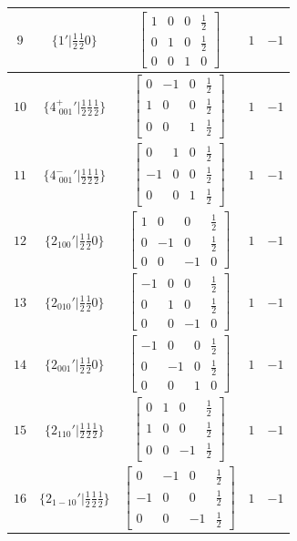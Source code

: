 \documentclass[fleqn,8pt]{jsarticle}
\begin{document}
\begin{longtable}{ccccc}
$ 9 $ & $ \{1{}'|\frac{1}{2} \frac{1}{2} 0\} $ & $ \begin{bmatrix} 1 & 0 & 0 & \frac{1}{2} \\ 0 & 1 & 0 & \frac{1}{2} \\ 0 & 0 & 1 & 0 \end{bmatrix} $ & $ 1 $ & $ -1 $ \\ \hline
$ 10 $ & $ \{4^{+}_{\,\,001}{}'|\frac{1}{2} \frac{1}{2} \frac{1}{2}\} $ & $ \begin{bmatrix} 0 & -1 & 0 & \frac{1}{2} \\ 1 & 0 & 0 & \frac{1}{2} \\ 0 & 0 & 1 & \frac{1}{2} \end{bmatrix} $ & $ 1 $ & $ -1 $ \\ \hline
$ 11 $ & $ \{4^{-}_{\,\,001}{}'|\frac{1}{2} \frac{1}{2} \frac{1}{2}\} $ & $ \begin{bmatrix} 0 & 1 & 0 & \frac{1}{2} \\ -1 & 0 & 0 & \frac{1}{2} \\ 0 & 0 & 1 & \frac{1}{2} \end{bmatrix} $ & $ 1 $ & $ -1 $ \\ \hline
$ 12 $ & $ \{2{}_{100}{}'|\frac{1}{2} \frac{1}{2} 0\} $ & $ \begin{bmatrix} 1 & 0 & 0 & \frac{1}{2} \\ 0 & -1 & 0 & \frac{1}{2} \\ 0 & 0 & -1 & 0 \end{bmatrix} $ & $ 1 $ & $ -1 $ \\ \hline
$ 13 $ & $ \{2{}_{010}{}'|\frac{1}{2} \frac{1}{2} 0\} $ & $ \begin{bmatrix} -1 & 0 & 0 & \frac{1}{2} \\ 0 & 1 & 0 & \frac{1}{2} \\ 0 & 0 & -1 & 0 \end{bmatrix} $ & $ 1 $ & $ -1 $ \\ \hline
$ 14 $ & $ \{2{}_{001}{}'|\frac{1}{2} \frac{1}{2} 0\} $ & $ \begin{bmatrix} -1 & 0 & 0 & \frac{1}{2} \\ 0 & -1 & 0 & \frac{1}{2} \\ 0 & 0 & 1 & 0 \end{bmatrix} $ & $ 1 $ & $ -1 $ \\ \hline
$ 15 $ & $ \{2{}_{110}{}'|\frac{1}{2} \frac{1}{2} \frac{1}{2}\} $ & $ \begin{bmatrix} 0 & 1 & 0 & \frac{1}{2} \\ 1 & 0 & 0 & \frac{1}{2} \\ 0 & 0 & -1 & \frac{1}{2} \end{bmatrix} $ & $ 1 $ & $ -1 $ \\ \hline
$ 16 $ & $ \{2{}_{1-10}{}'|\frac{1}{2} \frac{1}{2} \frac{1}{2}\} $ & $ \begin{bmatrix} 0 & -1 & 0 & \frac{1}{2} \\ -1 & 0 & 0 & \frac{1}{2} \\ 0 & 0 & -1 & \frac{1}{2} \end{bmatrix} $ & $ 1 $ & $ -1 $ \\
\end{longtable}
\end{document}
